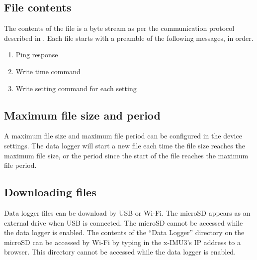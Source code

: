 \subsection{File contents}

The contents of the file is a byte stream as per the communication protocol described in .  Each file starts with a preamble of the following messages, in order.

\begin{enumerate}[nolistsep]
    \item Ping response
    \item Write time command
    \item Write setting command for each setting
\end{enumerate}

\subsection{Maximum file size and period}
\label{sec:maximumFileSizeAndPeriod}

A maximum file size and maximum file period can be configured in the device settings.  The data logger will start a new file each time the file size reaches the maximum file size, or the period since the start of the file reaches the maximum file period.

\subsection{Downloading files}

Data logger files can be download by \ac{USB} or Wi-Fi.  The \ac{microSD} appears as an external drive when \ac{USB} is connected.  The \ac{microSD} cannot be accessed while the data logger is enabled.  The contents of the \enquote{Data Logger} directory on the \ac{microSD} can be accessed by Wi-Fi by typing in the x-IMU3's \ac{IP} address to a browser.  This directory cannot be accessed while the data logger is enabled.
